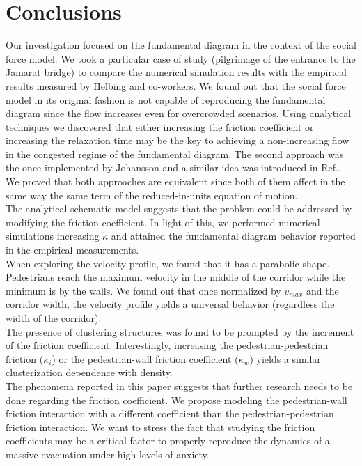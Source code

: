 \section{\label{conclusions}Conclusions}

Our investigation focused on the fundamental diagram in the context of the social force model. We took a particular case of study (pilgrimage of the entrance to the Jamarat bridge) to compare the numerical simulation results with the empirical results measured by Helbing and co-workers. We found out that the  social force model in its original fashion is not capable of reproducing the fundamental diagram since the flow increases even for overcrowded scenarios. Using analytical techniques we discovered that either increasing the friction coefficient or increasing the relaxation time may be the key to achieving a non-increasing flow in the congested regime of the fundamental diagram. The second approach was the once implemented by Johansson and a similar idea was introduced in Ref.\cite{parisi2}. We proved that both approaches are equivalent since both of them affect in the same way the same term of the reduced-in-units equation of motion.\\

The analytical schematic model suggests that the problem could be addressed by modifying the friction coefficient. In light of this, we performed numerical simulations increasing $\kappa$ and attained the fundamental diagram behavior reported in the empirical measurements. \\

When exploring the velocity profile, we found that it has a parabolic shape. Pedestrians reach the maximum velocity in the middle of the corridor while the minimum is by the walls. We found out that once normalized by $v_{max}$ and the corridor width, the velocity profile yields a universal behavior (regardless the width of the corridor).\\

The presence of clustering structures was found to be prompted by the increment of the friction coefficient. Interestingly, increasing the pedestrian-pedestrian friction ($\kappa_i$) or the pedestrian-wall friction coefficient ($\kappa_w$) yields a similar clusterization dependence with density.\\

The phenomena reported in this paper suggests that further research needs to be done regarding the friction coefficient. We propose modeling the pedestrian-wall friction interaction with a different coefficient than the pedestrian-pedestrian friction interaction. We want to stress the fact that studying the friction coefficients may be a critical factor to properly reproduce the dynamics of a massive evacuation under high levels of anxiety. 



